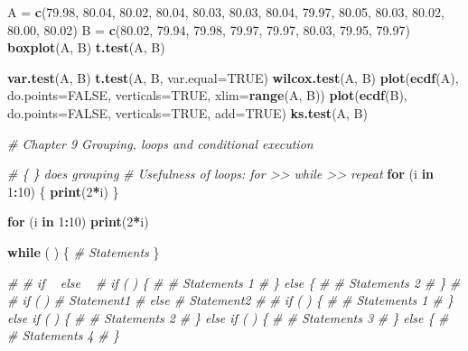 \documentclass[10pt,]{krantz}
\makeatletter
\newenvironment{Shaded}{\begin{snugshade}}{\end{snugshade}}
\newcommand{\KeywordTok}[1]{\textcolor[rgb]{0.13,0.29,0.53}{\textbf{#1}}}
\newcommand{\DataTypeTok}[1]{\textcolor[rgb]{0.13,0.29,0.53}{#1}}
\newcommand{\DecValTok}[1]{\textcolor[rgb]{0.00,0.00,0.81}{#1}}
\newcommand{\FloatTok}[1]{\textcolor[rgb]{0.00,0.00,0.81}{#1}}
\newcommand{\StringTok}[1]{\textcolor[rgb]{0.31,0.60,0.02}{#1}}
\newcommand{\CommentTok}[1]{\textcolor[rgb]{0.56,0.35,0.01}{\textit{#1}}}
\newcommand{\OtherTok}[1]{\textcolor[rgb]{0.56,0.35,0.01}{#1}}
\newcommand{\ControlFlowTok}[1]{\textcolor[rgb]{0.13,0.29,0.53}{\textbf{#1}}}
\newcommand{\OperatorTok}[1]{\textcolor[rgb]{0.81,0.36,0.00}{\textbf{#1}}}
\newcommand{\NormalTok}[1]{#1}
\newenvironment{kframe}{%
\medskip{}
\setlength{\fboxsep}{.8em}
 \def\at@end@of@kframe{}%
 \ifinner\ifhmode%
  \def\at@end@of@kframe{\end{minipage}}%
  \begin{minipage}{\columnwidth}%
 \fi\fi%
 \def\FrameCommand##1{\hskip\@totalleftmargin \hskip-\fboxsep
 \colorbox{shadecolor}{##1}\hskip-\fboxsep
     \hskip-\linewidth \hskip-\@totalleftmargin \hskip\columnwidth}%
 \MakeFramed {\advance\hsize-\width
   \@totalleftmargin\z@ \linewidth\hsize
   \@setminipage}}%
 {\par\unskip\endMakeFramed%
 \at@end@of@kframe}
\renewenvironment{Shaded}{\begin{kframe}}{\end{kframe}}
\theoremstyle{definition}
\theoremstyle{definition}
\theoremstyle{remark}
\makeatother
\begin{document}
\begin{Shaded}
\begin{Highlighting}[]
\NormalTok{A =}\StringTok{ }\KeywordTok{c}\NormalTok{(}\FloatTok{79.98}\NormalTok{, }\FloatTok{80.04}\NormalTok{, }\FloatTok{80.02}\NormalTok{, }\FloatTok{80.04}\NormalTok{, }\FloatTok{80.03}\NormalTok{, }\FloatTok{80.03}\NormalTok{, }\FloatTok{80.04}\NormalTok{, }\FloatTok{79.97}\NormalTok{, }\FloatTok{80.05}\NormalTok{, }\FloatTok{80.03}\NormalTok{, }\FloatTok{80.02}\NormalTok{, }\FloatTok{80.00}\NormalTok{, }\FloatTok{80.02}\NormalTok{)}
\NormalTok{B =}\StringTok{ }\KeywordTok{c}\NormalTok{(}\FloatTok{80.02}\NormalTok{, }\FloatTok{79.94}\NormalTok{, }\FloatTok{79.98}\NormalTok{, }\FloatTok{79.97}\NormalTok{, }\FloatTok{79.97}\NormalTok{, }\FloatTok{80.03}\NormalTok{, }\FloatTok{79.95}\NormalTok{, }\FloatTok{79.97}\NormalTok{)}
\KeywordTok{boxplot}\NormalTok{(A, B)}
\KeywordTok{t.test}\NormalTok{(A, B)}

\KeywordTok{var.test}\NormalTok{(A, B)}
\KeywordTok{t.test}\NormalTok{(A, B, }\DataTypeTok{var.equal=}\OtherTok{TRUE}\NormalTok{)}
\KeywordTok{wilcox.test}\NormalTok{(A, B)}
\KeywordTok{plot}\NormalTok{(}\KeywordTok{ecdf}\NormalTok{(A), }\DataTypeTok{do.points=}\OtherTok{FALSE}\NormalTok{, }\DataTypeTok{verticals=}\OtherTok{TRUE}\NormalTok{, }\DataTypeTok{xlim=}\KeywordTok{range}\NormalTok{(A, B))}
\KeywordTok{plot}\NormalTok{(}\KeywordTok{ecdf}\NormalTok{(B), }\DataTypeTok{do.points=}\OtherTok{FALSE}\NormalTok{, }\DataTypeTok{verticals=}\OtherTok{TRUE}\NormalTok{, }\DataTypeTok{add=}\OtherTok{TRUE}\NormalTok{)}
\KeywordTok{ks.test}\NormalTok{(A, B)}

\CommentTok{# Chapter 9 Grouping, loops and conditional execution}

\CommentTok{# \{ \} does grouping}
\CommentTok{# Usefulness of loops: for >> while >> repeat}
\ControlFlowTok{for}\NormalTok{ (i }\ControlFlowTok{in} \DecValTok{1}\OperatorTok{:}\DecValTok{10}\NormalTok{) \{}
  \KeywordTok{print}\NormalTok{(}\DecValTok{2}\OperatorTok{*}\NormalTok{i)}
\NormalTok{\}}

\ControlFlowTok{for}\NormalTok{ (i }\ControlFlowTok{in} \DecValTok{1}\OperatorTok{:}\DecValTok{10}\NormalTok{) }\KeywordTok{print}\NormalTok{(}\DecValTok{2}\OperatorTok{*}\NormalTok{i)}

\ControlFlowTok{while}\NormalTok{ (    ) \{}
\CommentTok{# Statements}
\NormalTok{\}}

\CommentTok{# # if ~ else ~}
\CommentTok{# if (   ) \{}
\CommentTok{# # Statements 1}
\CommentTok{# \} else \{}
\CommentTok{# # Statements 2}
\CommentTok{# \}}
\CommentTok{# }
\CommentTok{# if (    ) # Statement1}
\CommentTok{# else # Statement2}
\CommentTok{# }
\CommentTok{# if (   ) \{}
\CommentTok{# # Statements 1}
\CommentTok{# \} else if (   ) \{}
\CommentTok{# # Statements 2}
\CommentTok{# \} else if (   ) \{}
\CommentTok{# # Statements 3}
\CommentTok{# \} else \{}
\CommentTok{# # Statements 4  }
\CommentTok{# \}}


\end{Highlighting}
\end{Shaded}
\end{document}
